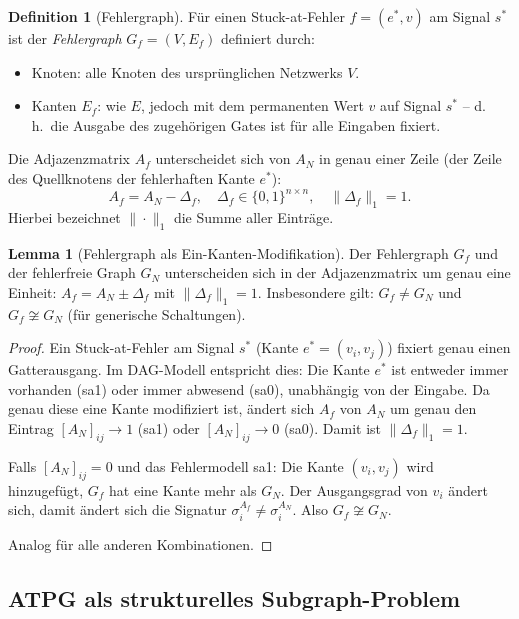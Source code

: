 ﻿\documentclass[a4paper,12pt]{article}
\theoremstyle{definition}
\newtheorem{definition}{Definition}
\newtheorem{lemma}{Lemma}
\begin{document}
\begin{definition}[Fehlergraph]\label{def:fehlergraph}
  Für einen Stuck-at-Fehler $f = (e^*, v)$ am Signal $s^*$ ist der \emph{Fehlergraph}
  $G_f = (V, E_f)$ definiert durch:
  \begin{itemize}
    \item Knoten: alle Knoten des ursprünglichen Netzwerks $V$.
    \item Kanten $E_f$: wie $E$, jedoch mit dem permanenten Wert $v$ auf Signal $s^*$
          -- d.\,h.\ die Ausgabe des zugehörigen Gates ist für alle Eingaben fixiert.
  \end{itemize}
  Die Adjazenzmatrix $A_f$ unterscheidet sich von $A_N$ in genau einer Zeile (der
  Zeile des Quellknotens der fehlerhaften Kante $e^*$):
  \[
    A_f = A_N - \Delta_f, \quad
    \Delta_f \in \{0,1\}^{n \times n}, \quad \|\Delta_f\|_1 = 1.
  \]
  Hierbei bezeichnet $\|\cdot\|_1$ die Summe aller Einträge.
\end{definition}

\begin{lemma}[Fehlergraph als Ein-Kanten-Modifikation]\label{lemma:fehlergraph}
  Der Fehlergraph $G_f$ und der fehlerfreie Graph $G_N$ unterscheiden sich in der
  Adjazenzmatrix um genau eine Einheit: $A_f = A_N \pm \Delta_f$ mit $\|\Delta_f\|_1 = 1$.
  Insbesondere gilt: $G_f \neq G_N$ und $G_f \not\cong G_N$ (für generische Schaltungen).
\end{lemma}

\begin{proof}
  Ein Stuck-at-Fehler am Signal $s^*$ (Kante $e^* = (v_i, v_j)$) fixiert genau einen
  Gatterausgang. Im DAG-Modell entspricht dies: Die Kante $e^*$ ist entweder immer
  vorhanden (sa1) oder immer abwesend (sa0), unabhängig von der Eingabe. Da genau
  diese eine Kante modifiziert ist, ändert sich $A_f$ von $A_N$ um genau den Eintrag
  $[A_N]_{ij} \to 1$ (sa1) oder $[A_N]_{ij} \to 0$ (sa0). Damit ist $\|\Delta_f\|_1 = 1$.

  Falls $[A_N]_{ij} = 0$ und das Fehlermodell sa1: Die Kante $(v_i, v_j)$ wird hinzugefügt,
  $G_f$ hat eine Kante mehr als $G_N$. Der Ausgangsgrad von $v_i$ ändert sich, damit
  ändert sich die Signatur $\sigma_i^{A_f} \neq \sigma_i^{A_N}$. Also $G_f \not\cong G_N$.

  Analog für alle anderen Kombinationen.
\end{proof}

\subsection{ATPG als strukturelles Subgraph-Problem}
\end{document}
